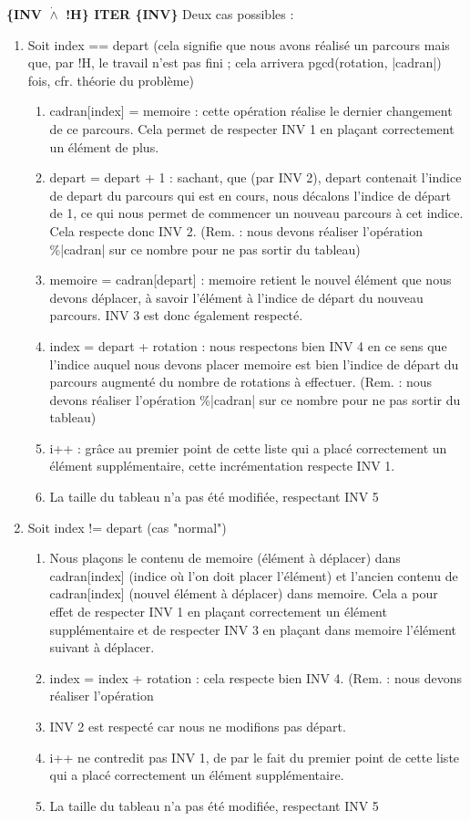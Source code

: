 \documentclass[a4paper, 12pt]{article}
\begin{document}
\textbf{\{INV $\dot{\wedge}$ !H\} ITER \{INV\}}
Deux cas possibles :\\
\begin{enumerate}
\item Soit index == depart (cela signifie que nous avons réalisé un parcours mais que, par !H, le travail n'est pas fini ; cela arrivera pgcd(rotation, |cadran|) fois, cfr. théorie du problème)
\begin{enumerate}

\item cadran[index] = memoire : cette opération réalise le dernier changement de ce parcours. Cela permet de respecter INV 1 en plaçant correctement un élément de plus.
\item depart = depart + 1 : sachant, que (par INV 2), depart contenait l'indice de depart du parcours qui est en cours, nous décalons l'indice de départ de 1, ce qui nous permet de commencer un nouveau parcours à cet indice. Cela respecte donc INV 2. (Rem. : nous devons réaliser l'opération \%|cadran| sur ce nombre pour ne pas sortir du tableau)
\item memoire = cadran[depart] : memoire retient le nouvel élément que nous devons déplacer, à savoir l'élément à l'indice de départ du nouveau parcours. INV 3 est donc également respecté.
\item index = depart + rotation : nous respectons bien INV 4 en ce sens que l'indice auquel nous devons placer memoire est bien l'indice de départ du parcours augmenté du nombre de rotations à effectuer. (Rem. : nous devons réaliser l'opération \%|cadran| sur ce nombre pour ne pas sortir du tableau)
\item i++ : grâce au premier point de cette liste qui a placé correctement un élément supplémentaire, cette incrémentation respecte INV 1.
\item La taille du tableau n'a pas été modifiée, respectant INV 5
\end{enumerate}
\item Soit index != depart (cas "normal")\\
\begin{enumerate}
\item Nous plaçons le contenu de memoire (élément à déplacer) dans cadran[index] (indice où l'on doit placer l'élément) et l'ancien contenu de cadran[index] (nouvel élément à déplacer) dans memoire. Cela a pour effet de respecter INV 1 en plaçant correctement un élément supplémentaire et de respecter INV 3 en plaçant dans memoire l'élément suivant à déplacer.
\item index = index + rotation : cela respecte bien INV 4. (Rem. : nous devons réaliser l'opération %
\item INV 2 est respecté car nous ne modifions pas départ.
\item i++ ne contredit pas INV 1, de par le fait du premier point de cette liste qui a placé correctement un élément supplémentaire.\\
\item La taille du tableau n'a pas été modifiée, respectant INV 5
\end{enumerate}
\end{enumerate}
\end{document}

